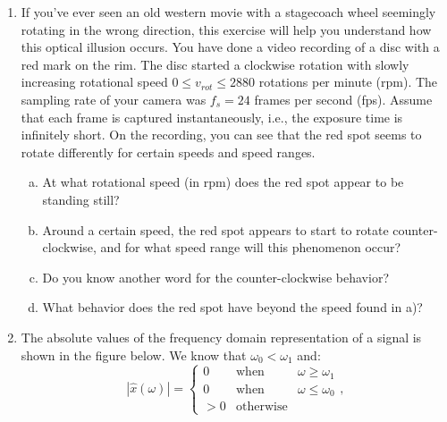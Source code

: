 \begin{enumerate}
\item If you've ever seen an old western movie with a stagecoach wheel seemingly rotating in the wrong direction, this exercise will help you understand how this optical illusion occurs. You have done a video recording of a disc with a red mark on the rim. The disc started a clockwise rotation with slowly increasing rotational speed $0 \le v_{rot} \le 2880$ rotations per minute (rpm). The sampling rate of your camera was $f_s = 24$ frames per second (fps). Assume that each frame is captured instantaneously, i.e., the exposure time is infinitely short. On the recording, you can see that the red spot seems to rotate differently for certain speeds and speed ranges.
  \begin{enumerate}[a)]
    \item At what rotational speed (in rpm) does the red spot appear to be standing still?
    \item Around a certain speed, the red spot appears to start to rotate counter-clockwise, and for what speed range will this phenomenon occur?
    \item Do you know another word for the counter-clockwise behavior?
    \item What behavior does the red spot have beyond the speed found in a)?
  \end{enumerate}
\item The absolute values of the frequency domain representation of a signal is shown in the figure below. We know that $\omega_{0}<\omega_{1}$ and:
  \begin{equation}
    |\hat{x}(\omega)| = \left\{\begin{array}{ccc}
    0 & \mathrm{when} & \omega \ge \omega_1\\
    0 & \mathrm{when} & \omega \le \omega_0\\
    >0 & \mathrm{otherwise} &
    \end{array}\right.,
    \end{equation}
\begin{center}
\end{center}
\end{enumerate}
